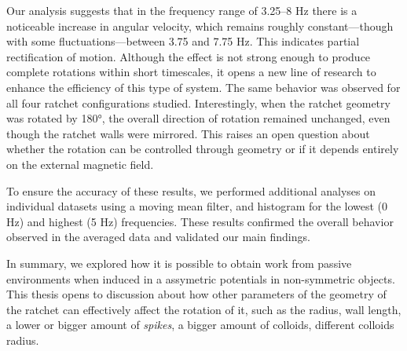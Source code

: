 Our analysis suggests that in the frequency range of 3.25–8 Hz there is a noticeable increase in angular velocity, which remains roughly constant—though with some fluctuations—between 3.75 and 7.75 Hz. This indicates partial rectification of motion. Although the effect is not strong enough to produce complete rotations within short timescales, it opens a new line of research to enhance the efficiency of this type of system. The same behavior was observed for all four ratchet configurations studied. Interestingly, when the ratchet geometry was rotated by 180°, the overall direction of rotation remained unchanged, even though the ratchet walls were mirrored. This raises an open question about whether the rotation can be controlled through geometry or if it depends entirely on the external magnetic field.

To ensure the accuracy of these results, we performed additional analyses on individual datasets using a moving mean filter, and histogram for the lowest (0 Hz) and highest (5 Hz) frequencies. These results confirmed the overall behavior observed in the averaged data and validated our main findings.

In summary, we explored how it is possible to obtain work from passive environments when induced in a assymetric potentials in non-symmetric objects. This thesis opens to discussion about how other parameters of the geometry of the ratchet can effectively affect the rotation of it, such as the radius, wall length, a lower or bigger amount of \textit{spikes}, a bigger amount of colloids, different colloids radius. 
